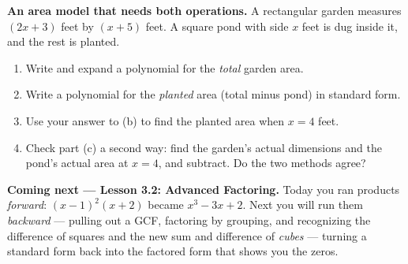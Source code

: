\documentclass[10pt]{article}
\begin{document}
\begin{extensionbox}
\textbf{An area model that needs both operations.} A rectangular garden measures $(2x+3)$ feet by
$(x+5)$ feet. A square pond with side $x$ feet is dug inside it, and the rest is planted.
\begin{enumerate}[label=(\alph*), leftmargin=1.8em, itemsep=5pt]
  \item Write and expand a polynomial for the \emph{total} garden area.
  \item Write a polynomial for the \emph{planted} area (total minus pond) in standard form.
  \item Use your answer to (b) to find the planted area when $x = 4$ feet.
  \item Check part (c) a second way: find the garden's actual dimensions and the pond's actual area at
        $x=4$, and subtract. Do the two methods agree?
\end{enumerate}
\end{extensionbox}

\begin{spiralbox}
\textbf{Coming next --- Lesson 3.2: Advanced Factoring.} Today you ran products \emph{forward}:
$(x-1)^2(x+2)$ became $x^3-3x+2$. Next you will run them \emph{backward} --- pulling out a GCF,
factoring by grouping, and recognizing the difference of squares and the new sum and difference of
\emph{cubes} --- turning a standard form back into the factored form that shows you the zeros.
\end{spiralbox}
\end{document}
